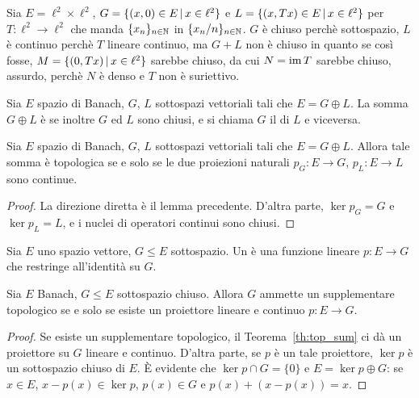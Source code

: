 \begin{counterexample}
	Sia $E= \ell^2 \times \ell^2$, $G = \{(x,0) \in E \,|\, x \in \ell^2\}$ e $L=\{(x,Tx) \in E \,|\, x \in \ell^2\}$ per $T: \ell^2 \to \ell^2$ che manda $\{x_n\}_{n \in \mathbb{N}}$ in $\{x_n/n\}_{n \in \mathbb{N}}$. $G$ è chiuso perchè sottospazio, $L$ è continuo perchè $T$ lineare continuo, ma $G+L$ non è chiuso in quanto se così fosse, $M=\{(0, Tx) \,|\, x \in \ell^2\}$ sarebbe chiuso, da cui $N= \operatorname{im} T$ sarebbe chiuso, assurdo, perchè $N$ è denso e $T$ non è suriettivo.
\end{counterexample}

\begin{definition}
	Sia $E$ spazio di Banach, $G$, $L$ sottospazi vettoriali tali che $E=G \oplus L$. La somma $G \oplus L$ è  se inoltre $G$ ed $L$ sono chiusi, e si chiama $G$ il  di $L$ e viceversa.
\end{definition}

\begin{theorem}
\label{th:top_sum}
	Sia $E$ spazio di Banach, $G$, $L$ sottospazi vettoriali tali che $E=G \oplus L$.
	Allora tale somma è topologica se e solo se le due proiezioni naturali $p_G : E \to G$, $p_L : E \to L$ sono continue.
\end{theorem}
\begin{proof}
	La direzione diretta è il lemma precedente. D'altra parte, $\ker p_G = G$ e $\ker p_L = L$, e i nuclei di operatori continui sono chiusi.
\end{proof}

\begin{definition}
\label{def:projector}
	Sia $E$ uno spazio vettore, $G \leq E$ sottospazio.
	Un  è una funzione lineare $p:E \to G$ che restringe all'identità su $G$.
\end{definition}

\begin{lemma}
	Sia $E$ Banach, $G \leq E$ sottospazio chiuso.
	Allora $G$ ammette un supplementare topologico se e solo se esiste un proiettore lineare e continuo $p:E \to G$.
\end{lemma}
\begin{proof}
	Se esiste un supplementare topologico, il Teorema~\ref{th:top_sum} ci dà un proiettore su $G$ lineare e continuo.
	D'altra parte, se $p$ è un tale proiettore, $\ker p$ è un sottospazio chiuso di $E$. È evidente che $\ker p \cap G = \{0\}$ e $E = \ker p \oplus G$: se $x \in E$, $x - p(x) \in \ker p$, $p(x) \in G$ e $p(x) +(x- p(x)) = x$.
\end{proof}

